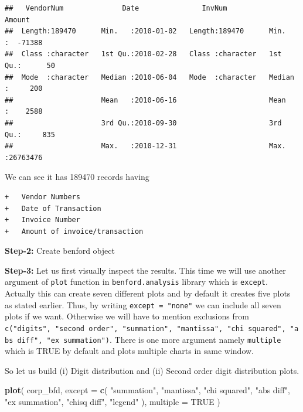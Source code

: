 \documentclass[
]{book}
\newenvironment{Shaded}{\begin{snugshade}}{\end{snugshade}}
\newcommand{\AttributeTok}[1]{\textcolor[rgb]{0.13,0.29,0.53}{#1}}
\newcommand{\ConstantTok}[1]{\textcolor[rgb]{0.56,0.35,0.01}{#1}}
\newcommand{\DecValTok}[1]{\textcolor[rgb]{0.00,0.00,0.81}{#1}}
\newcommand{\FunctionTok}[1]{\textcolor[rgb]{0.13,0.29,0.53}{\textbf{#1}}}
\newcommand{\NormalTok}[1]{#1}
\newcommand{\OtherTok}[1]{\textcolor[rgb]{0.56,0.35,0.01}{#1}}
\newcommand{\SpecialCharTok}[1]{\textcolor[rgb]{0.81,0.36,0.00}{\textbf{#1}}}
\newcommand{\StringTok}[1]{\textcolor[rgb]{0.31,0.60,0.02}{#1}}
\begin{document}
\begin{verbatim}
##   VendorNum              Date               InvNum              Amount        
##  Length:189470      Min.   :2010-01-02   Length:189470      Min.   :  -71388  
##  Class :character   1st Qu.:2010-02-28   Class :character   1st Qu.:      50  
##  Mode  :character   Median :2010-06-04   Mode  :character   Median :     200  
##                     Mean   :2010-06-16                      Mean   :    2588  
##                     3rd Qu.:2010-09-30                      3rd Qu.:     835  
##                     Max.   :2010-12-31                      Max.   :26763476
\end{verbatim}

We can see it has 189470 records having

\begin{verbatim}
+   Vendor Numbers
+   Date of Transaction
+   Invoice Number
+   Amount of invoice/transaction
\end{verbatim}

\textbf{Step-2:} Create benford object

\begin{Shaded}
\end{Shaded}

\textbf{Step-3:} Let us first visually inspect the results. This time we will use another argument of \texttt{plot} function in \texttt{benford.analysis} library which is \texttt{except}. Actually this can create seven different plots and by default it creates five plots as stated earlier. Thus, by writing \texttt{except\ =\ "none"} we can include all seven plots if we want. Otherwise we will have to mention exclusions from \texttt{c("digits",\ "second\ order",\ "summation",\ "mantissa",\ "chi\ squared",\ "abs\ diff",\ "ex\ summation")}. There is one more argument namely \texttt{multiple} which is TRUE by default and plots multiple charts in same window.

So let us build (i) Digit distribution and (ii) Second order digit distribution plots.

\begin{Shaded}
\begin{Highlighting}[]
\FunctionTok{plot}\NormalTok{(}
\NormalTok{  corp\_bfd,}
  \AttributeTok{except =} \FunctionTok{c}\NormalTok{(}
    \StringTok{"summation"}\NormalTok{,}
    \StringTok{"mantissa"}\NormalTok{,}
    \StringTok{"chi squared"}\NormalTok{,}
    \StringTok{"abs diff"}\NormalTok{,}
    \StringTok{"ex summation"}\NormalTok{,}
    \StringTok{"chisq diff"}\NormalTok{,}
    \StringTok{"legend"}
\NormalTok{  ),}
  \AttributeTok{multiple =} \ConstantTok{TRUE}
\NormalTok{)}
\end{Highlighting}
\end{Shaded}
\end{document}
